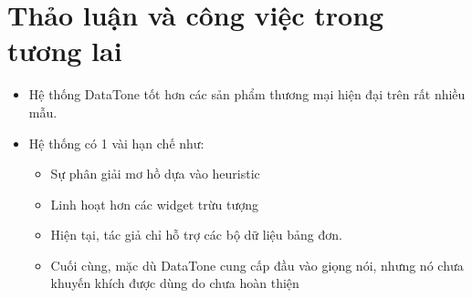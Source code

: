 \documentclass[12pt]{report}
\begin{document}
\section{Thảo luận và công việc trong tương lai}
\begin{itemize}
	\item Hệ thống DataTone tốt hơn các sản phẩm thương mại hiện đại trên rất nhiều mẫu.
	
	\item Hệ thống có 1 vài hạn chế như:
		\begin{itemize}
			\item Sự phân giải mơ hồ dựa vào heuristic
			
			\item Linh hoạt hơn các  widget trừu tượng
			 
			\item Hiện tại, tác giả chỉ hỗ trợ các bộ dữ liệu bảng đơn.
			
			\item Cuối cùng, mặc dù DataTone cung cấp đầu vào giọng nói, nhưng nó chưa khuyến khích được dùng do chưa hoàn thiện
			
		\end{itemize}
	
\end{itemize}
\end{document}
